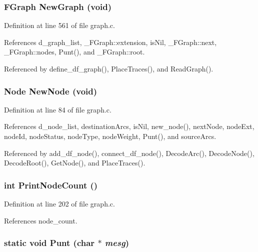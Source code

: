 \subsubsection{\setlength{\rightskip}{0pt plus 5cm}\bf{FGraph} New\-Graph (void)}\label{graph_8c_1beb6b65e030388214bb0d0e35ea4d79}




Definition at line 561 of file graph.c.

References d\_\-graph\_\-list, \_\-FGraph::extension, is\-Nil, \_\-FGraph::next, \_\-FGraph::nodes, Punt(), and \_\-FGraph::root.

Referenced by define\_\-df\_\-graph(), Place\-Traces(), and Read\-Graph().
\subsubsection{\setlength{\rightskip}{0pt plus 5cm}\bf{Node} New\-Node (void)}\label{graph_8c_4317fcef2f2213d9d6e173c66b8c0f18}




Definition at line 84 of file graph.c.

References d\_\-node\_\-list, destination\-Arcs, is\-Nil, new\_\-node(), next\-Node, node\-Ext, node\-Id, node\-Status, node\-Type, node\-Weight, Punt(), and source\-Arcs.

Referenced by add\_\-df\_\-node(), connect\_\-df\_\-node(), Decode\-Arc(), Decode\-Node(), Decode\-Root(), Get\-Node(), and Place\-Traces().
\subsubsection{\setlength{\rightskip}{0pt plus 5cm}int Print\-Node\-Count ()}\label{graph_8c_6af02c1663796d089f1effcb6317a5f9}




Definition at line 202 of file graph.c.

References node\_\-count.
\subsubsection{\setlength{\rightskip}{0pt plus 5cm}static void Punt (char $\ast$ {\em mesg})\hspace{0.3cm}{\tt  [static]}}\label{graph_8c_5e4a7703cc8669ffef811a7f4a99562f}




